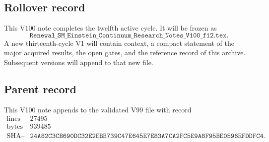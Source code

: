 \documentclass[11pt]{article}
\theoremstyle{remark}
\begin{document}
\subsection{Rollover record}

This V100 note completes the twelfth active cycle.  It will be frozen
as
\[
 \texttt{Renewal\_SM\_Einstein\_Continuum\_Research\_Notes\_V100\_f12.tex}.
                                                                    \tag{100.8}
\]
A new thirteenth-cycle V1 will contain context, a compact statement
of the major acquired results, the open gates, and the reference
record of this archive.  Subsequent versions will append to that new
file.

\subsection{Parent record}

This V100 note appends to the validated V99 file with record
\[
\begin{array}{c|c}
\text{lines}&27495\\
\text{bytes}&939485\\
\text{SHA--256}&
\texttt{24A82C3CB690DC32E2EBB739C47E645E7E83A7CA2FC5E9A8F95BE0596EFDDFC4}.
\end{array}
\]

\end{document}
